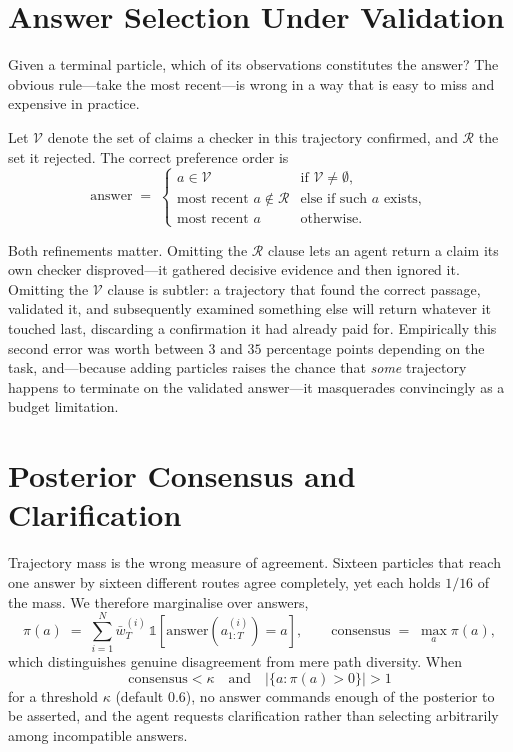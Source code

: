 \documentclass[11pt,a4paper]{article}
\begin{document}
\section{Answer Selection Under Validation}
\label{sec:selection}

Given a terminal particle, which of its observations constitutes the answer?
The obvious rule---take the most recent---is wrong in a way that is easy to
miss and expensive in practice.

Let $\mathcal{V}$ denote the set of claims a checker in this trajectory
confirmed, and $\mathcal{R}$ the set it rejected. The correct preference order
is
\begin{equation}
\text{answer} \;=\;
\begin{cases}
a \in \mathcal{V} & \text{if } \mathcal{V} \neq \emptyset,\\[0.3em]
\text{most recent } a \notin \mathcal{R} & \text{else if such } a \text{ exists},\\[0.3em]
\text{most recent } a & \text{otherwise.}
\end{cases}
\label{eq:answer}
\end{equation}

Both refinements matter. Omitting the $\mathcal{R}$ clause lets an agent return
a claim its own checker disproved---it gathered decisive evidence and then
ignored it. Omitting the $\mathcal{V}$ clause is subtler: a trajectory that
found the correct passage, validated it, and subsequently examined something
else will return whatever it touched last, discarding a confirmation it had
already paid for. Empirically this second error was worth between $3$ and $35$
percentage points depending on the task, and---because adding particles raises
the chance that \emph{some} trajectory happens to terminate on the validated
answer---it masquerades convincingly as a budget limitation.

\section{Posterior Consensus and Clarification}
\label{sec:consensus}

Trajectory mass is the wrong measure of agreement. Sixteen particles that reach
one answer by sixteen different routes agree completely, yet each holds
$1/16$ of the mass. We therefore marginalise over answers,
\begin{equation}
\pi(a) \;=\; \sum_{i=1}^{N} \bar w_T^{(i)} \,
             \mathbb{1}\!\left[\mathrm{answer}(a_{1:T}^{(i)}) = a\right],
\qquad
\mathrm{consensus} \;=\; \max_a \pi(a),
\end{equation}
which distinguishes genuine disagreement from mere path diversity. When
\begin{equation}
\mathrm{consensus} < \kappa \quad\text{and}\quad |\{a : \pi(a) > 0\}| > 1
\end{equation}
for a threshold $\kappa$ (default $0.6$), no answer commands enough of the
posterior to be asserted, and the agent requests clarification rather than
selecting arbitrarily among incompatible answers.
\end{document}

